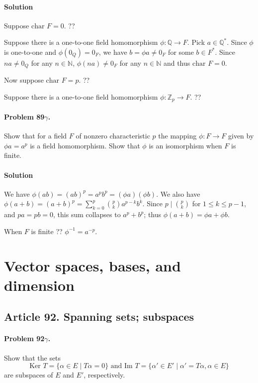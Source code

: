 \paragraph*{Solution}
Suppose $\mbox{char } F = 0$. ??

Suppose there is a one-to-one field homomorphism $\phi : \mathbb{Q} \rightarrow F$.
Pick $a \in \mathbb{Q}^*$. Since $\phi$ is one-to-one and $\phi (0_Q) = 0_F$, we
have $b = \phi a \neq 0_F$ for some $b \in F^*$. Since $na \neq 0_Q$ for any
$n \in \mathbb{N}$, $\phi (na) \neq 0_F$ for any $n \in \mathbb{N}$ and thus
$\mbox{char } F = 0$.

Now suppose $\mbox{char } F = p$. ??

Suppose there is a one-to-one field homomorphism $\phi : \mathbb{Z}_p \rightarrow F$.
??

\paragraph{Problem 89$\gamma$.}
Show that for a field $F$ of nonzero characteristic $p$ the mapping
$\phi : F \rightarrow F$ given by $\phi a = a^p$ is a field homomorphism. Show
that $\phi$ is an isomorphism when $F$ is finite.

\paragraph*{Solution}
We have $\phi(ab) = (ab)^p = a^p b^p = (\phi a)(\phi b)$. We also have
$\phi(a+b) = (a+b)^p = \sum_{k=0}^p \binom{p}{k} a^{p-k} b^{k}$.
Since $p \mid \binom{p}{k}$ for $1 \leq k \leq p-1$, and $pa = pb = 0$, this
sum collapses to $a^p + b^p$; thus $\phi(a+b) = \phi a + \phi b$.

When $F$ is finite ?? $\phi^{-1} = a^{-p}$.


\section{Vector spaces, bases, and dimension}


\subsection{Article 92. Spanning sets; subspaces}

\paragraph{Problem 92$\gamma$.}
Show that the sets
$$ \mbox{Ker } T = \{ \alpha \in E \mid T\alpha = 0 \} \mbox{ and }
\mbox{Im } T = \{ \alpha ' \in E' \mid \alpha ' = T\alpha, \alpha \in E \}$$
are subspaces of $E$ and $E'$, respectively.


